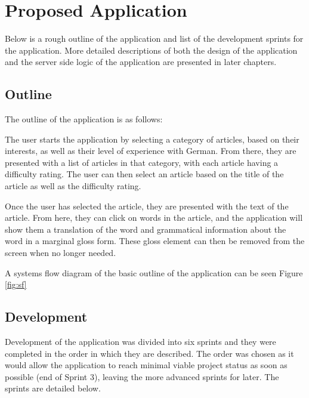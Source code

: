 \chapter{Proposed Application}

Below is a rough outline of the application and list of the development sprints for the application. More detailed descriptions of both the design of the application and the server side logic of the application are presented in later chapters. 

\section{Outline}

The outline of the application is as follows: 

The user starts the application by selecting a category of articles, based on their interests, as well as their level of experience with German. From there, they are presented with a list of articles in that category, with each article having a difficulty rating. The user can then select an article based on the title of the article as well as the difficulty rating.

Once the user has selected the article, they are presented with the text of the article. From here, they can click on words in the article, and the application will show them a translation of the word and grammatical information about the word in a marginal gloss form. These gloss element can then be removed from the screen when no longer needed.

A systems flow diagram of the basic outline of the application can be seen Figure \ref{fig:sf}



\section{Development}

Development of the application was divided into six sprints and they were completed in the order in which they are described. The order was chosen as it would allow the application to reach minimal viable project status as soon as possible (end of Sprint 3), leaving the more advanced sprints for later. The sprints are detailed below.

